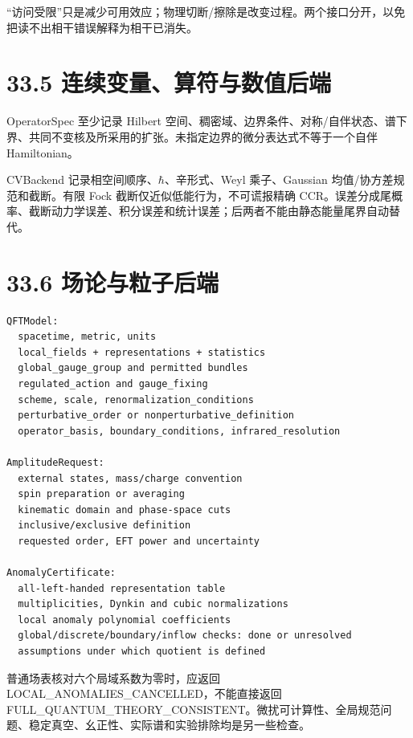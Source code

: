\documentclass[
  11pt,
  oneside]{book}
\begin{document}
``访问受限''只是减少可用效应；物理切断/擦除是改变过程。两个接口分开，以免把读不出相干错误解释为相干已消失。

\hypertarget{ux8fdeux7eedux53d8ux91cfux7b97ux7b26ux4e0eux6570ux503cux540eux7aef}{%
\section{33.5
连续变量、算符与数值后端}\label{ux8fdeux7eedux53d8ux91cfux7b97ux7b26ux4e0eux6570ux503cux540eux7aef}}

OperatorSpec 至少记录 Hilbert
空间、稠密域、边界条件、对称/自伴状态、谱下界、共同不变核及所采用的扩张。未指定边界的微分表达式不等于一个自伴
Hamiltonian。

CVBackend 记录相空间顺序、\(\hbar\)、辛形式、Weyl 乘子、Gaussian
均值/协方差规范和截断。有限 Fock 截断仅近似低能行为，不可谎报精确
CCR。误差分成尾概率、截断动力学误差、积分误差和统计误差；后两者不能由静态能量尾界自动替代。

\hypertarget{ux573aux8bbaux4e0eux7c92ux5b50ux540eux7aef}{%
\section{33.6
场论与粒子后端}\label{ux573aux8bbaux4e0eux7c92ux5b50ux540eux7aef}}

\begin{Verbatim}[breaklines,breakanywhere,fontsize=\scriptsize]
QFTModel:
  spacetime, metric, units
  local_fields + representations + statistics
  global_gauge_group and permitted bundles
  regulated_action and gauge_fixing
  scheme, scale, renormalization_conditions
  perturbative_order or nonperturbative_definition
  operator_basis, boundary_conditions, infrared_resolution

AmplitudeRequest:
  external states, mass/charge convention
  spin preparation or averaging
  kinematic domain and phase-space cuts
  inclusive/exclusive definition
  requested order, EFT power and uncertainty

AnomalyCertificate:
  all-left-handed representation table
  multiplicities, Dynkin and cubic normalizations
  local anomaly polynomial coefficients
  global/discrete/boundary/inflow checks: done or unresolved
  assumptions under which quotient is defined
\end{Verbatim}

普通场表核对六个局域系数为零时，应返回
LOCAL\_\allowbreak ANOMALIES\_\allowbreak CANCELLED，不能直接返回
FULL\_\allowbreak QUANTUM\_\allowbreak THEORY\_\allowbreak CONSISTENT。微扰可计算性、全局规范问题、稳定真空、幺正性、实际谱和实验排除均是另一些检查。
\end{document}

